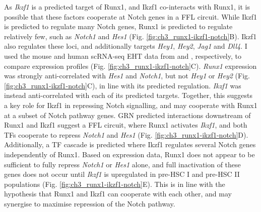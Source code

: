 As \textit{Ikzf1} is a predicted target of Runx1, and Ikzf1 co-interacts with Runx1, it is possible that these factors cooperate at Notch genes in a FFL circuit. While Ikzf1 is predicted to regulate many Notch genes, Runx1 is predicted to regulate relatively few, such as \textit{Notch1} and \textit{Hes1} (Fig. \ref{fig:ch3_runx1-ikzf1-notch}B). Ikzf1 also regulates these loci, and additionally targets \textit{Hey1}, \textit{Hey2}, \textit{Jag1} and \textit{Dll4}. I used the mouse and human scRNA-seq EHT data from \cite{zhu_developmental_2020} and \cite{zeng_tracing_2019}, respectively, to compare expression profiles (Fig. \ref{fig:ch3_runx1-ikzf1-notch}C). \textit{Runx1} expression was strongly anti-correlated with \textit{Hes1} and \textit{Notch1}, but not \textit{Hey1} or \textit{Hey2} (Fig. \ref{fig:ch3_runx1-ikzf1-notch}C), in line with its predicted regulation. \textit{Ikzf1} was instead anti-correlated with each of its predicted targets. Together, this suggests a key role for Ikzf1 in repressing Notch signalling, and may cooperate with Runx1 at a subset of Notch pathway genes. GRN predicted interactions downstream of Runx1 and Ikzf1 suggest a FFL circuit, where Runx1 activates \textit{Ikzf1}, and both TFs cooperate to repress \textit{Notch1} and \textit{Hes1} (Fig. \ref{fig:ch3_runx1-ikzf1-notch}D). Additionally, a TF cascade is predicted where Ikzf1 regulates several Notch genes independently of Runx1. Based on expression data, Runx1 does not appear to be sufficient to fully repress \textit{Notch1} or \textit{Hes1} alone, and full inactivation of these genes does not occur until \textit{Ikzf1} is upregulated in pre-HSC I and pre-HSC II populations (Fig. \ref{fig:ch3_runx1-ikzf1-notch}E). This is in line with the hypothesis that Runx1 and Ikzf1 can cooperate with each other, and may synergise to maximise repression of the Notch pathway.

